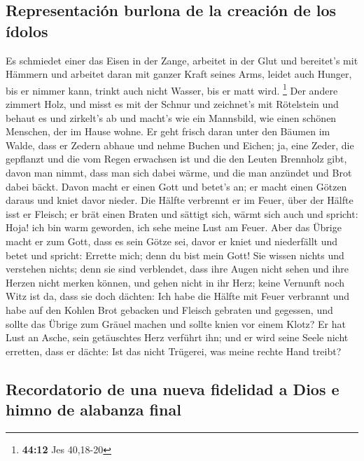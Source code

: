 \hypertarget{representaciuxf3n-burlona-de-la-creaciuxf3n-de-los-uxeddolos}{%
\subsection{Representación burlona de la creación de los
ídolos}\label{representaciuxf3n-burlona-de-la-creaciuxf3n-de-los-uxeddolos}}

 Es schmiedet einer das Eisen in der Zange, arbeitet in
der Glut und bereitet's mit Hämmern und arbeitet daran mit ganzer Kraft
seines Arms, leidet auch Hunger, bis er nimmer kann, trinkt auch nicht
Wasser, bis er matt wird. \footnote{\textbf{44:12} Jes 40,18-20}
 Der andere zimmert Holz, und misst es mit der Schnur und
zeichnet's mit Rötelstein und behaut es und zirkelt's ab und macht's wie
ein Mannsbild, wie einen schönen Menschen, der im Hause wohne.
 Er geht frisch daran unter den Bäumen im Walde, dass er
Zedern abhaue und nehme Buchen und Eichen; ja, eine Zeder, die gepflanzt
und die vom Regen erwachsen ist  und die den Leuten
Brennholz gibt, davon man nimmt, dass man sich dabei wärme, und die man
anzündet und Brot dabei bäckt. Davon macht er einen Gott und betet's an;
er macht einen Götzen daraus und kniet davor nieder.  Die
Hälfte verbrennt er im Feuer, über der Hälfte isst er Fleisch; er brät
einen Braten und sättigt sich, wärmt sich auch und spricht: Hoja! ich
bin warm geworden, ich sehe meine Lust am Feuer.  Aber
das Übrige macht er zum Gott, dass es sein Götze sei, davor er kniet und
niederfällt und betet und spricht: Errette mich; denn du bist mein Gott!
 Sie wissen nichts und verstehen nichts; denn sie sind
verblendet, dass ihre Augen nicht sehen und ihre Herzen nicht merken
können,  und gehen nicht in ihr Herz; keine Vernunft noch
Witz ist da, dass sie doch dächten: Ich habe die Hälfte mit Feuer
verbrannt und habe auf den Kohlen Brot gebacken und Fleisch gebraten und
gegessen, und sollte das Übrige zum Gräuel machen und sollte knien vor
einem Klotz?  Er hat Lust an Asche, sein getäuschtes Herz
verführt ihn; und er wird seine Seele nicht erretten, dass er dächte:
Ist das nicht Trügerei, was meine rechte Hand treibt?

\hypertarget{recordatorio-de-una-nueva-fidelidad-a-dios-e-himno-de-alabanza-final}{%
\subsection{Recordatorio de una nueva fidelidad a Dios e himno de
alabanza
final}\label{recordatorio-de-una-nueva-fidelidad-a-dios-e-himno-de-alabanza-final}}

